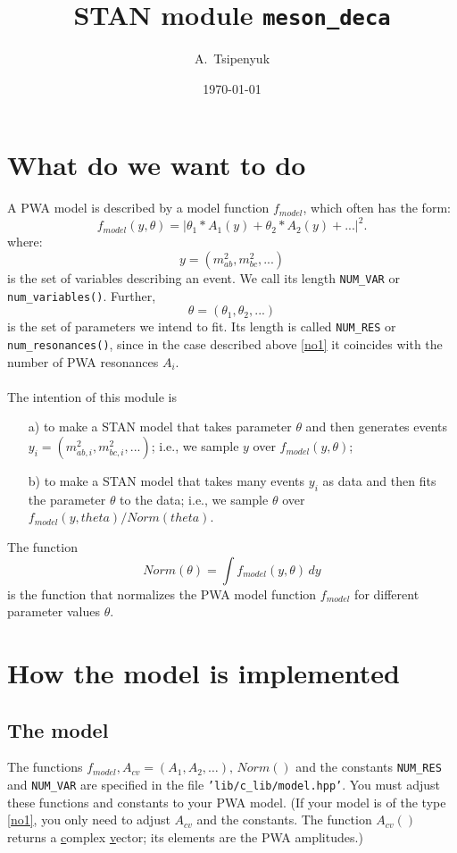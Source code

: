 \documentclass[a4paper]{article}
\title{STAN module \texttt{meson_deca}}
\author{A.~Tsipenyuk}
\date{\today}
\begin{document}
\section{What do we want to do}

A PWA model is described by a model function $f_{model}$, which often has
the form:
\begin{equation}\label{no1}
f_{model}(y, \theta) = |\theta_1 * A_1(y) + \theta_2 * A_2(y) + ...|^2.
\end{equation}
where:
$$
y = (m^2_{ab}, m^2_{bc}, ...)
$$
is the set of variables describing an event. We call its length \texttt{NUM\_VAR} or \texttt{num\_variables()}. Further,
$$
\theta = (\theta_1, \theta_2, ...)
$$
is the set of parameters we intend to fit. Its length is called \texttt{NUM\_RES} or \texttt{num\_resonances()}, 
since in the case described above \eqref{no1} it coincides with the number of PWA resonances $A_i$.\\
\quad\\
The intention of this module is
\begin{itemize}
\item[a)] to make a STAN model that takes parameter $\theta$ and then generates events $y_i = (m^2_{ab,i}, m^2_{bc,i}, ...)$; i.e., we sample $y$ over $f_{model}(y,\theta)$;
\item[b)] to make a STAN model that takes many events $y_i$ as data and then fits the parameter $\theta$ to the data; i.e., we sample $\theta$ over $f_{model}(y,theta)/Norm(theta)$.
\end{itemize}
The function 
$$
Norm(\theta) = \int f_{model}(y,\theta)\, dy
$$
is the function that normalizes the PWA model function $f_{model}$ for different parameter values $\theta$.


\section{How the model is implemented}
\subsection{The model}
The functions $f_{model}, A_{cv}=(A_1,A_2,\ldots),\, Norm()$ and the constants \texttt{NUM\_RES} and \texttt{NUM\_VAR} 
are specified in the file \texttt{'lib/c\_lib/model.hpp'}. You must adjust these functions and constants to your PWA model. 
(If your model is of the type \eqref{no1}, you only need to adjust $A_{cv}$ and the constants.
The function $A_{cv}()$ returns a \underline{c}omplex \underline{v}ector; its elements are the PWA amplitudes.)
\end{document}

